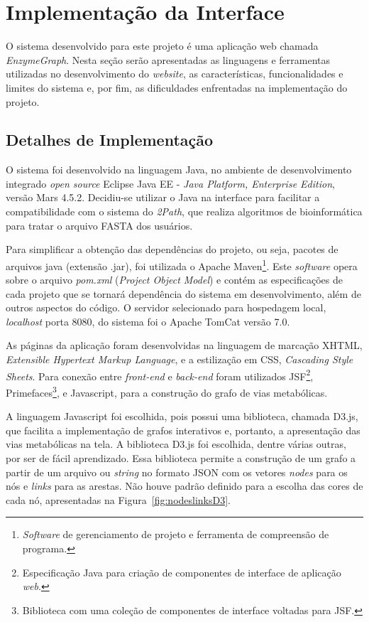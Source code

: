 \section{Implementação da Interface} \label{implementacao}


\indent O sistema desenvolvido para este projeto é uma aplicação web chamada \textit{EnzymeGraph}. Nesta seção serão apresentadas as linguagens e ferramentas utilizadas no desenvolvimento do \textit{website}, as características, funcionalidades e limites do sistema e, por fim, as dificuldades enfrentadas na implementação do projeto.

\subsection{Detalhes de Implementação}

\indent O sistema foi desenvolvido na linguagem Java, no ambiente de desenvolvimento integrado \textit{open source} Eclipse Java EE - \textit{Java Platform, Enterprise Edition}, versão Mars 4.5.2. Decidiu-se utilizar o Java na interface para facilitar a compatibilidade com o sistema do \textit{2Path}, que realiza algoritmos de bioinformática para tratar o arquivo FASTA dos usuários.

\indent Para simplificar a obtenção das dependências do projeto, ou seja, pacotes de arquivos java (extensão .jar), foi utilizada o Apache Maven\footnote{\textit{Software} de gerenciamento de projeto e ferramenta de compreensão de programa.}. Este \textit{software} opera sobre o arquivo \textit{pom.xml} (\textit{Project Object Model}) e contém as especificações de cada projeto que se tornará dependência do sistema em desenvolvimento, além de outros aspectos do código. O servidor selecionado para hospedagem local, \textit{localhost} porta 8080, do sistema foi o Apache TomCat versão 7.0.

\indent As páginas da aplicação foram desenvolvidas na linguagem de marcação XHTML, \textit{Extensible Hypertext Markup Language}, e a estilização em CSS, \textit{Cascading Style Sheets}. Para conexão entre \textit{front-end} e \textit{back-end} foram utilizados JSF\footnote{Especificação Java para criação de componentes de interface de aplicação \textit{web}.}, Primefaces\footnote{Biblioteca com uma coleção de componentes de interface voltadas para JSF.}, e Javascript, para a construção do grafo de vias metabólicas.

\indent A linguagem Javascript foi escolhida, pois possui uma biblioteca, chamada D3.js, que facilita a implementação de grafos interativos e, portanto, a apresentação das vias metabólicas na tela. A biblioteca D3.js foi escolhida, dentre várias outras, por ser de fácil aprendizado. Essa biblioteca permite a construção de um grafo a partir de um arquivo ou \textit{string} no formato JSON com os vetores \textit{nodes} para os nós e \textit{links} para as arestas. Não houve padrão definido para a escolha das cores de cada nó, apresentadas na Figura~\ref{fig:nodeslinksD3}.

